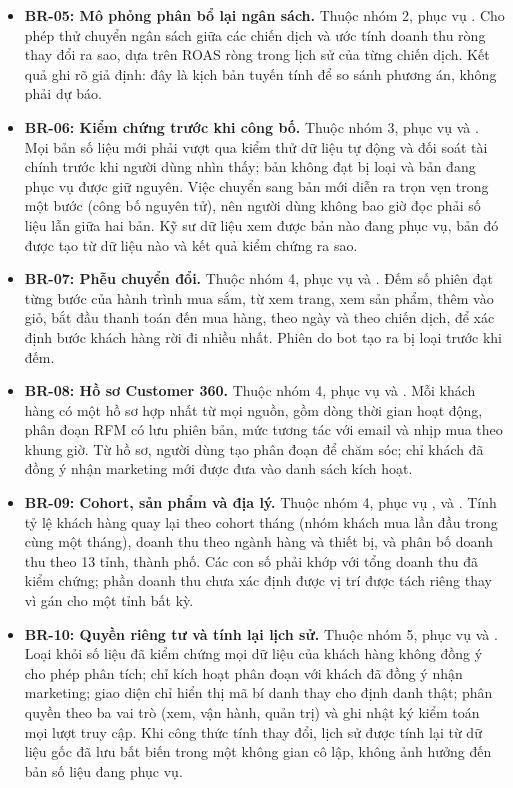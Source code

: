 \begin{itemize}
    \item {}\label{br:05}\textbf{BR-05: Mô phỏng phân bổ lại ngân sách.} Thuộc nhóm 2, phục vụ \shCMO. Cho phép thử chuyển ngân sách giữa các chiến dịch và ước tính doanh thu ròng thay đổi ra sao, dựa trên ROAS ròng trong lịch sử của từng chiến dịch. Kết quả ghi rõ giả định: đây là kịch bản tuyến tính để so sánh phương án, không phải dự báo.
    \item {}\label{br:06}\textbf{BR-06: Kiểm chứng trước khi công bố.} Thuộc nhóm 3, phục vụ \shDE{} và \shCMO. Mọi bản số liệu mới phải vượt qua kiểm thử dữ liệu tự động và đối soát tài chính trước khi người dùng nhìn thấy; bản không đạt bị loại và bản đang phục vụ được giữ nguyên. Việc chuyển sang bản mới diễn ra trọn vẹn trong một bước (công bố nguyên tử), nên người dùng không bao giờ đọc phải số liệu lẫn giữa hai bản. Kỹ sư dữ liệu xem được bản nào đang phục vụ, bản đó được tạo từ dữ liệu nào và kết quả kiểm chứng ra sao.
    \item {}\label{br:07}\textbf{BR-07: Phễu chuyển đổi.} Thuộc nhóm 4, phục vụ \shEC{} và \shDA. Đếm số phiên đạt từng bước của hành trình mua sắm, từ xem trang, xem sản phẩm, thêm vào giỏ, bắt đầu thanh toán đến mua hàng, theo ngày và theo chiến dịch, để xác định bước khách hàng rời đi nhiều nhất. Phiên do bot tạo ra bị loại trước khi đếm.
    \item {}\label{br:08}\textbf{BR-08: Hồ sơ Customer 360.} Thuộc nhóm 4, phục vụ \shCRM{} và \shDA. Mỗi khách hàng có một hồ sơ hợp nhất từ mọi nguồn, gồm dòng thời gian hoạt động, phân đoạn RFM có lưu phiên bản, mức tương tác với email và nhịp mua theo khung giờ. Từ hồ sơ, người dùng tạo phân đoạn để chăm sóc; chỉ khách đã đồng ý nhận marketing mới được đưa vào danh sách kích hoạt.
    \item {}\label{br:09}\textbf{BR-09: Cohort, sản phẩm và địa lý.} Thuộc nhóm 4, phục vụ \shCRM, \shEC{} và \shDA. Tính tỷ lệ khách hàng quay lại theo cohort tháng (nhóm khách mua lần đầu trong cùng một tháng), doanh thu theo ngành hàng và thiết bị, và phân bố doanh thu theo 13 tỉnh, thành phố. Các con số phải khớp với tổng doanh thu đã kiểm chứng; phần doanh thu chưa xác định được vị trí được tách riêng thay vì gán cho một tỉnh bất kỳ.
    \item {}\label{br:10}\textbf{BR-10: Quyền riêng tư và tính lại lịch sử.} Thuộc nhóm 5, phục vụ \shDO{} và \shDE. Loại khỏi số liệu đã kiểm chứng mọi dữ liệu của khách hàng không đồng ý cho phép phân tích; chỉ kích hoạt phân đoạn với khách đã đồng ý nhận marketing; giao diện chỉ hiển thị mã bí danh thay cho định danh thật; phân quyền theo ba vai trò (xem, vận hành, quản trị) và ghi nhật ký kiểm toán mọi lượt truy cập. Khi công thức tính thay đổi, lịch sử được tính lại từ dữ liệu gốc đã lưu bất biến trong một không gian cô lập, không ảnh hưởng đến bản số liệu đang phục vụ.
\end{itemize}

